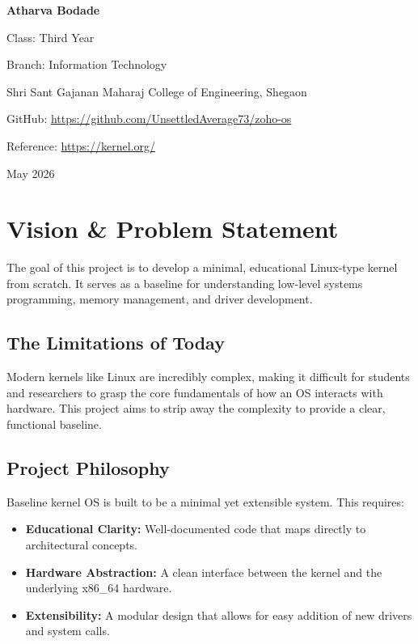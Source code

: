 \documentclass[12pt,a4paper]{report}
\begin{document}
\begin{titlepage}
    \vspace{0.8cm}
    {\large\bfseries Atharva Bodade} \par
     \vspace{0.2cm}
    {\small Class: Third Year \par}
    \vspace{0.2cm}
    {\small Branch: Information Technology \par}
    \vspace{0.12cm}
    {\small Shri Sant Gajanan Maharaj College of Engineering, Shegaon \par}
    \vspace{0.25cm}
    {\small GitHub: \href{https://github.com/UnsettledAverage73/zoho-os}{https://github.com/UnsettledAverage73/zoho-os}} \par
    \vspace{0.2cm}
    {\small Reference: \href{https://kernel.org/}{https://kernel.org/}} \par

    \vfill
    {\large May 2026}
\end{titlepage}

\tableofcontents
\newpage

\chapter{Vision \& Problem Statement}
The goal of this project is to develop a minimal, educational Linux-type kernel from scratch. It serves as a baseline for understanding low-level systems programming, memory management, and driver development.

\section{The Limitations of Today}
Modern kernels like Linux are incredibly complex, making it difficult for students and researchers to grasp the core fundamentals of how an OS interacts with hardware. This project aims to strip away the complexity to provide a clear, functional baseline.

\section{Project Philosophy}
Baseline kernel OS is built to be a minimal yet extensible system. This requires:
\begin{itemize}
    \item \textbf{Educational Clarity:} Well-documented code that maps directly to architectural concepts.
    \item \textbf{Hardware Abstraction:} A clean interface between the kernel and the underlying x86\_64 hardware.
    \item \textbf{Extensibility:} A modular design that allows for easy addition of new drivers and system calls.
\end{itemize}
\end{document}
